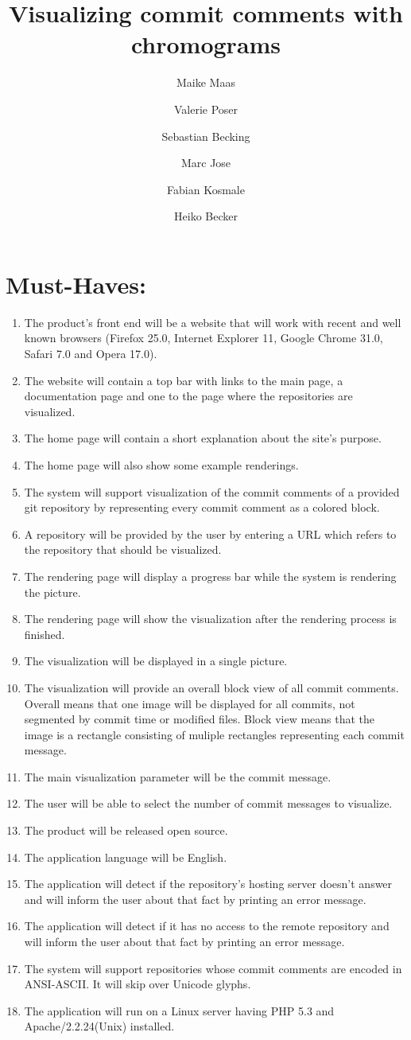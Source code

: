 \documentclass[12pt]{scrartcl}
\author{Maike Maas \and Valerie Poser \and Sebastian Becking
\and Marc Jose \and Fabian Kosmale  \and Heiko Becker}
\title{Visualizing commit comments with chromograms}
\begin{document}
\maketitle
\section{Must-Haves:}
\begin{enumerate}
\item The product's front end will be a website that will work with recent and well known browsers (Firefox 25.0, Internet Explorer 11, Google Chrome 31.0, Safari 7.0 and Opera 17.0). 
\item The website will contain a top bar with links to the main page, a documentation page and one to the page where the repositories are visualized. 
\item The home page will contain a short explanation about the site's purpose.
\item The home page will also show some example renderings.
\item The system will support visualization of the commit comments of a provided git repository by representing every commit comment as a colored block.
\item A repository will be provided by the user by entering a URL which refers to the repository that should be visualized.
\item The rendering page will display a progress bar while the system is rendering the picture.
\item The rendering page will show the visualization after the rendering process is finished.
\item The visualization will be displayed in a single picture.
\item The visualization will provide an overall block view of all commit
	comments. Overall means that one image will be displayed for all
	commits, not segmented by commit time or modified files. Block view means
	that the image is a rectangle consisting of muliple rectangles
	representing each commit message.
\item The main visualization parameter will be the commit message.
\item The user will be able to select the number of commit messages to visualize. 
\item The product will be released open source.
\item The application language will be English.
\item The application will detect if the repository's hosting server doesn't answer and will inform the user about that fact by printing an error message.
\item The application will detect if it has no access to the remote repository and will inform the user about that fact by printing an error message.
\item The system will support repositories whose commit comments are encoded in
	ANSI-ASCII. It will skip over Unicode glyphs.
\item The application will run on a Linux server having PHP 5.3 and Apache/2.2.24(Unix) installed.
\end{enumerate}
\end{document}
